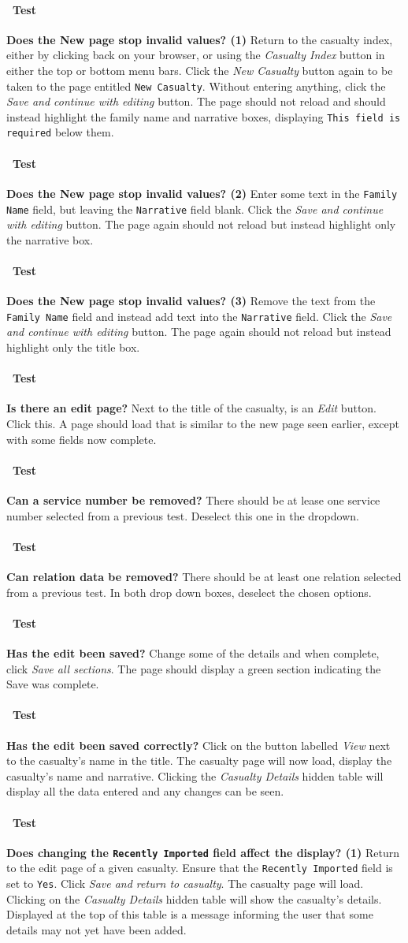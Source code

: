 \documentclass[12pt]{article}
\newcounter{Test}
\newcommand{\test}[1]{%
\stepcounter{Test}%
\paragraph{\Circle\ Test \theTest} \textbf{#1} }
\begin{document}
\test{Does the New page stop invalid values? (1)}
Return to the casualty index, either by clicking back on your browser, or using the \textit{Casualty Index} button in either the top or bottom menu bars. Click the \textit{New Casualty} button again to be taken to the page entitled \texttt{New Casualty}. Without entering anything, click the \textit{Save and continue with editing} button. The page should not reload and should instead highlight the family name and narrative boxes, displaying \texttt{This field is required} below them.

\test{Does the New page stop invalid values? (2)}
Enter some text in the \texttt{Family Name} field, but leaving the \texttt{Narrative} field blank. Click the \textit{Save and continue with editing} button. The page again should not reload but instead highlight only the narrative box.

\test{Does the New page stop invalid values? (3)}
Remove the text from the \texttt{Family Name} field and instead add text into the \texttt{Narrative} field. Click the \textit{Save and continue with editing} button. The page again should not reload but instead highlight only the title box.

\test{Is there an edit page?}
Next to the title of the casualty, is an \textit{Edit} button. Click this. A page should load that is similar to the new page seen earlier, except with some fields now complete.

\test{Can a service number be removed?}
There should be at lease one service number selected from a previous test. Deselect this one in the dropdown.

\test{Can relation data be removed?}
There should be at least one relation selected from a previous test. In both drop down boxes, deselect the chosen options.

\test{Has the edit been saved?}
Change some of the details and when complete, click \textit{Save all sections}. The page should display a green section indicating the Save was complete.

\test{Has the edit been saved correctly?}
Click on the button labelled \textit{View} next to the casualty's name in the title. The casualty page will now load, display the casualty's name and narrative. Clicking the \textit{Casualty Details} hidden table will display all the data entered and any changes can be seen.

\test{Does changing the \texttt{Recently Imported} field affect the display? (1)}
Return to the edit page of a given casualty. Ensure that the \texttt{Recently Imported} field is set to \texttt{Yes}. Click \textit{Save and return to casualty}. The casualty page will load. Clicking on the \textit{Casualty Details} hidden table will show the casualty's details. Displayed at the top of this table is a message informing the user that some details may not yet have been added.
\end{document}
